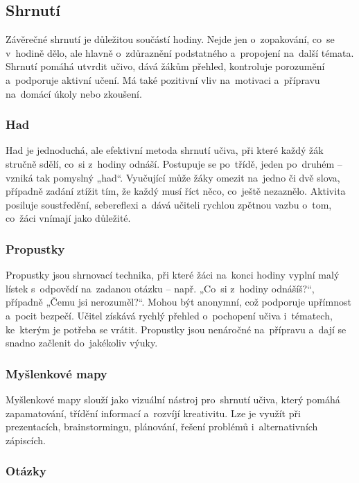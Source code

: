 \documentclass[male,czech,api_bc]{kitheses}
\begin{document}
\subsection{Shrnutí}

Závěrečné shrnutí je důležitou součástí hodiny. Nejde jen o~zopakování, co~se v~hodině dělo, ale hlavně o~zdůraznění podstatného a~propojení na~další témata. Shrnutí pomáhá utvrdit učivo, dává žákům přehled, kontroluje porozumění a~podporuje aktivní učení. Má také pozitivní vliv na~motivaci a~přípravu na~domácí úkoly nebo zkoušení.

\subsubsection{Had}

Had je jednoduchá, ale efektivní metoda shrnutí učiva, při které každý žák stručně sdělí, co~si z~hodiny odnáší. Postupuje se po~třídě, jeden po~druhém – vzniká tak pomyslný „had“. Vyučující může žáky omezit na~jedno či dvě slova, případně zadání ztížit tím, že každý musí říct něco, co~ještě nezaznělo. Aktivita posiluje soustředění, sebereflexi a~dává učiteli rychlou zpětnou vazbu o~tom, co~žáci vnímají jako důležité.

\subsubsection{Propustky}

Propustky jsou shrnovací technika, při které žáci na~konci hodiny vyplní malý lístek s~odpovědí na~zadanou otázku – např. „Co~si z~hodiny odnášíš?“, případně „Čemu jsi nerozuměl?“. Mohou být anonymní, což podporuje upřímnost a~pocit bezpečí. Učitel získává rychlý přehled o~pochopení učiva i~tématech, ke~kterým je potřeba se vrátit. Propustky jsou nenáročné na~přípravu a~dají se snadno začlenit do~jakékoliv výuky.

\subsubsection{Myšlenkové mapy}

Myšlenkové mapy slouží jako vizuální nástroj pro~shrnutí učiva, který pomáhá zapamatování, třídění informací a~rozvíjí kreativitu. Lze je využít při prezentacích, brainstormingu, plánování, řešení problémů i~alternativních zápiscích.

\subsubsection{Otázky}
\end{document}
